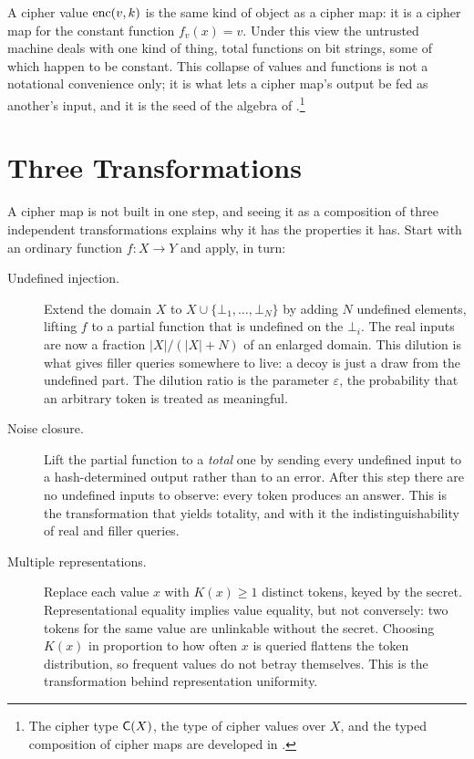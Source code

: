 \begin{remark}
\label{rem:values-are-maps}
A cipher value $\operatorname{enc}(v, k)$ is the same kind of object as a cipher map: it
is a cipher map for the constant function $f_v(x) = v$. Under this view the
untrusted machine deals with one kind of thing, total functions on bit
strings, some of which happen to be constant. This collapse of values and
functions is not a notational convenience only; it is what lets a cipher
map's output be fed as another's input, and it is the seed of the algebra
of .\footnote{The cipher type $\mathsf{C}(X)$, the type of
cipher values over $X$, and the typed composition of cipher maps are
developed in .}
\end{remark}

\section{Three Transformations}
\label{sec:three-transformations}

A cipher map is not built in one step, and seeing it as a composition of
three independent transformations explains why it has the properties it
has. Start with an ordinary function $f : X \to Y$ and apply, in turn:

\begin{description}
\item[Undefined injection.] Extend the domain $X$ to $X \cup \{\bot_1,
  \ldots, \bot_N\}$ by adding $N$ undefined elements, lifting $f$ to a
  partial function that is undefined on the $\bot_i$. The real inputs are
  now a fraction $\lvert X \rvert / (\lvert X \rvert + N)$ of an enlarged
  domain. This dilution is what gives filler queries somewhere to live: a
  decoy is just a draw from the undefined part. The dilution ratio is the
  parameter $\varepsilon$, the probability that an arbitrary token is
  treated as meaningful.
\item[Noise closure.] Lift the partial function to a \emph{total} one by
  sending every undefined input to a hash-determined output rather than to
  an error. After this step there are no undefined inputs to observe: every
  token produces an answer. This is the transformation that yields
  totality, and with it the indistinguishability of real and filler
  queries.
\item[Multiple representations.] Replace each value $x$ with $K(x) \geq 1$
  distinct tokens, keyed by the secret. Representational equality implies
  value equality, but not conversely: two tokens for the same value are
  unlinkable without the secret. Choosing $K(x)$ in proportion to how often
  $x$ is queried flattens the token distribution, so frequent values do not
  betray themselves. This is the transformation behind representation
  uniformity.
\end{description}

